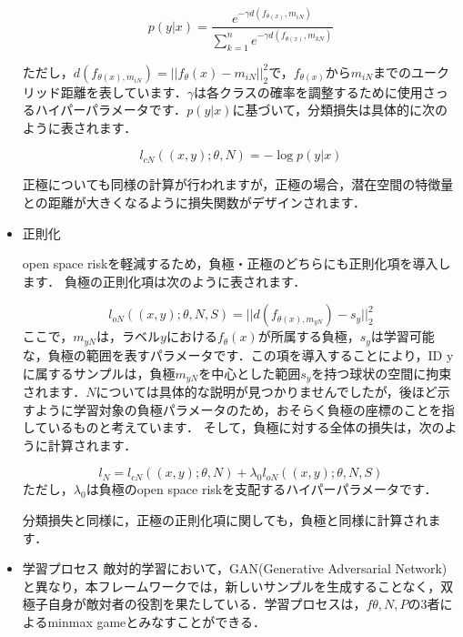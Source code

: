 \documentclass[dvipdfmx]{jsarticle}
\begin{document}
\begin{itemize}
\begin{equation}\label{}
p(y|x) = \frac{e^{-\gamma d (f_{\theta (x)}, m_{iN})}}{\sum_{k=1}^{n} e^{-\gamma d (f_{\theta (x)}, m_{kN})}}
\end{equation}

ただし，$d(f_{\theta (x), m_{iN}}) = ||f_{\theta}(x) - m_{iN}||_{2}^{2}$で，$f_{\theta (x)}$から$m_{iN}$までのユークリッド距離を表しています．$\gamma$は各クラスの確率を調整するために使用さっるハイパーパラメータです．$p(y|x)$に基づいて，分類損失は具体的に次のように表されます．

\begin{equation}\label{}
l_{cN}((x, y);\theta, N) = -\log p(y|x)
\end{equation}

正極についても同様の計算が行われますが，正極の場合，潜在空間の特徴量との距離が大きくなるように損失関数がデザインされます．

    \item 正則化

open space riskを軽減するため，負極・正極のどちらにも正則化項を導入します．
負極の正則化項は次のように表されます．

\begin{equation}\label{}
l_{oN}((x, y);\theta, N, S) = ||d(f_{\theta(x), m_{yN}}) - s_y||_{2}^2
\end{equation}
ここで，$m_{yN}$は，ラベル$y$における$f_{\theta}(x)$が所属する負極，$s_y$は学習可能な，負極の範囲を表すパラメータです．この項を導入することにより，ID yに属するサンプルは，負極$m_{yN}$を中心とした範囲$s_y$を持つ球状の空間に拘束されます．$N$については具体的な説明が見つかりませんでしたが，後ほど示すように学習対象の負極パラメータのため，おそらく負極の座標のことを指しているものと考えています．
そして，負極に対する全体の損失は，次のように計算されます．

\begin{equation}\label{}
l_N = l_{cN}((x, y);\theta, N) + \lambda_{0} l_{oN}((x, y);\theta, N, S)
\end{equation}
ただし，$\lambda_{0}$は負極のopen space riskを支配するハイパーパラメータです．

分類損失と同様に，正極の正則化項に関しても，負極と同様に計算されます．

    \item 学習プロセス
敵対的学習において，GAN(Generative Adversarial Network)と異なり，本フレームワークでは，新しいサンプルを生成することなく，双極子自身が敵対者の役割を果たしている．学習プロセスは，$f\theta, N, P$の3者によるminmax gameとみなすことができる．


\end{itemize}
\end{document}
